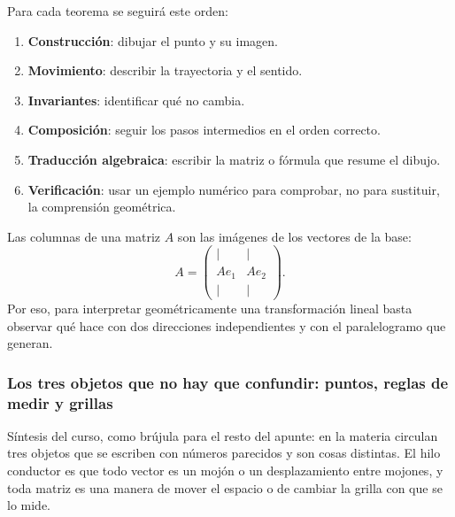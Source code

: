 \begin{idea}
Para cada teorema se seguirá este orden:
\begin{enumerate}
  \item \textbf{Construcción}: dibujar el punto y su imagen.
  \item \textbf{Movimiento}: describir la trayectoria y el sentido.
  \item \textbf{Invariantes}: identificar qué no cambia.
  \item \textbf{Composición}: seguir los pasos intermedios en el orden correcto.
  \item \textbf{Traducción algebraica}: escribir la matriz o fórmula que resume el dibujo.
  \item \textbf{Verificación}: usar un ejemplo numérico para comprobar, no para sustituir,
  la comprensión geométrica.
\end{enumerate}
\end{idea}

\begin{resultado}
Las columnas de una matriz \(A\) son las imágenes de los vectores de la base:
\[
  A=
  \begin{pmatrix}\vert&\vert\\Ae_1&Ae_2\\\vert&\vert\end{pmatrix}.
\]
Por eso, para interpretar geométricamente una transformación lineal basta observar qué hace
con dos direcciones independientes y con el paralelogramo que generan.
\end{resultado}


\subsubsection{Los tres objetos que no hay que confundir: puntos, reglas de medir y grillas}\label{sec:puntos-formas-grillas}

{\small\vspace{1mm}\par}

Síntesis del curso, como brújula para el resto del apunte: en la materia circulan tres objetos
que se escriben con números parecidos y son cosas distintas. El hilo conductor es que
todo vector es un mojón o un desplazamiento entre mojones, y toda matriz es una manera de
mover el espacio o de cambiar la grilla con que se lo mide.

